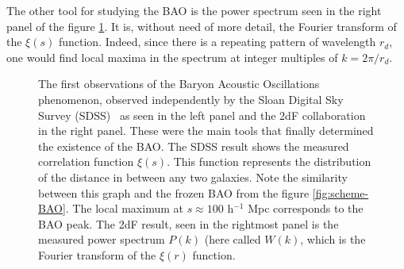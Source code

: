 The other tool for studying the BAO is the power spectrum seen in the right panel of the figure \ref{fig:2005-results}. It is, without need of more detail, the Fourier transform of the $\xi(s)$ function. Indeed, since there is a repeating pattern of wavelength $r_d$, one would find local maxima in the spectrum at integer multiples of $k = 2\pi /r_d$. \\

\begin{figure}[t] \centering
	\hspace{0.2pt}
	\caption[First BAO observations by the SDSS and the 2dF groups]{The first observations of the Baryon Acoustic Oscillations phenomenon, observed independently by the Sloan Digital Sky Survey (SDSS)~\cite{Eisenstein2005} as seen in the left panel and the 2dF collaboration~\cite{2dFCole2005} in the right panel. These were the main tools that finally determined the existence of the BAO. The SDSS result shows the measured correlation function $\xi(s)$. This function represents the distribution of the distance in between any two galaxies. Note the similarity between this graph and the frozen BAO from the figure \ref{fig:scheme-BAO}. The local maximum at $s\approx 100$ h$^{-1}$ Mpc corresponds to the BAO peak. The 2dF result, seen in the rightmost panel is the measured power spectrum $P(k)$ (here called  $W(k)$, which is the Fourier transform of the $\xi(r)$ function.}
	\label{fig:2005-results}
\end{figure}


